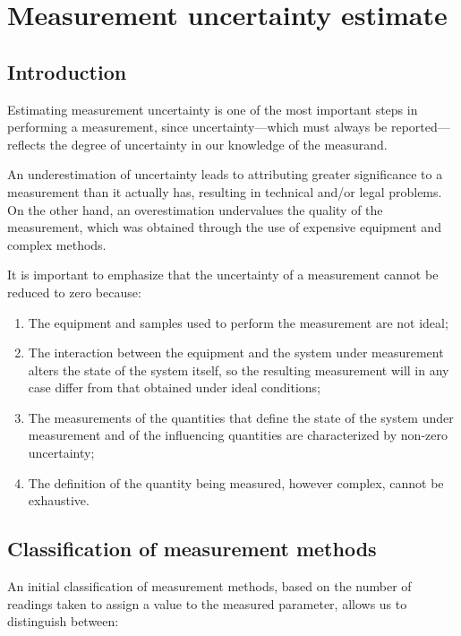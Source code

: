 \documentclass[../main.tex]{subfiles}
\begin{document}
\clearpage
\thispagestyle{empty}
\section{Measurement uncertainty estimate}

\subsection{Introduction}

Estimating measurement uncertainty is one of the most important steps in performing a measurement, since uncertainty—which must always be reported—reflects the degree of uncertainty in our knowledge of the measurand. 

An underestimation of uncertainty leads to attributing greater significance to a measurement than it actually has, resulting in technical and/or legal problems. On the other hand, an overestimation undervalues the quality of the measurement, which was obtained through the use of expensive equipment and complex methods. 

It is important to emphasize that the uncertainty of a measurement cannot be reduced to zero because: 

\begin{enumerate}
	\item[\textbf{-}] The equipment and samples used to perform the measurement are not ideal;
	\item[\textbf{-}] The interaction between the equipment and the system under measurement alters the state of the system itself, so the resulting measurement will in any case differ from that obtained under ideal conditions;
	\item[\textbf{-}] The measurements of the quantities that define the state of the system under measurement and of the influencing quantities are characterized by non-zero uncertainty;
	\item[\textbf{-}] The definition of the quantity being measured, however complex, cannot be exhaustive.
\end{enumerate}

\subsection{Classification of measurement methods}


An initial classification of measurement methods, based on the number of readings taken to assign a value to the measured parameter, allows us to distinguish between:\\
\end{document}
